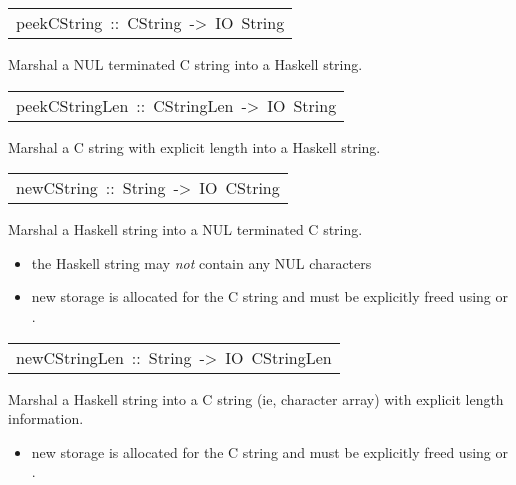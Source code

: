 \begin{haddockdesc}
\item[\begin{tabular}{@{}l}
peekCString\ ::\ CString\ ->\ IO\ String
\end{tabular}]\haddockbegindoc
Marshal a NUL terminated C string into a Haskell string.
\par

\end{haddockdesc}
\begin{haddockdesc}
\item[\begin{tabular}{@{}l}
peekCStringLen\ ::\ CStringLen\ ->\ IO\ String
\end{tabular}]\haddockbegindoc
Marshal a C string with explicit length into a Haskell string.
\par

\end{haddockdesc}
\begin{haddockdesc}
\item[\begin{tabular}{@{}l}
newCString\ ::\ String\ ->\ IO\ CString
\end{tabular}]\haddockbegindoc
Marshal a Haskell string into a NUL terminated C string.
\par
\begin{itemize}
\item
 the Haskell string may \emph{not} contain any NUL characters
\par

\item
 new storage is allocated for the C string and must be
   explicitly freed using  or
   .
\par

\end{itemize}

\end{haddockdesc}
\begin{haddockdesc}
\item[\begin{tabular}{@{}l}
newCStringLen\ ::\ String\ ->\ IO\ CStringLen
\end{tabular}]\haddockbegindoc
Marshal a Haskell string into a C string (ie, character array) with
 explicit length information.
\par
\begin{itemize}
\item
 new storage is allocated for the C string and must be
   explicitly freed using  or
   .
\par

\end{itemize}

\end{haddockdesc}
